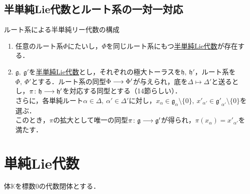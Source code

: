\documentclass[rep_main]{subfiles}
\begin{document}
\subsection{半単純Lie代数とルート系の一対一対応}
\begin{mytheo}[label=thm:root-to-Lie-alg]{ルート系による半単純リー代数の構成}
	\begin{enumerate}
		\item 任意のルート系$\Phi$にたいし，$\Phi$を同じルート系にもつ\hyperref[def:semisimple-LieAlg]{半単純Lie代数}が存在する．
		\item $\mathfrak{g},\ \mathfrak{g}'$を\hyperref[def:semisimple-LieAlg]{半単純Lie代数}とし，それぞれの極大トーラスを$\mathfrak{h},\ \mathfrak{h}'$，ルート系を$\Phi,\ \Phi'$とする．ルート系の同型$\Phi \longrightarrow \Phi'$が与えられ，底を$\Delta \mapsto \Delta'$と送るとし，$\pi\colon \mathfrak{h} \longrightarrow \mathfrak{h}'$を対応する同型とする（14節らしい）．\\
		さらに，各単純ルート$\alpha \in \Delta,\ \alpha' \in \Delta'$に対し，$x_\alpha \in \mathfrak{g}_\alpha \setminus \{0\},\ x'_{\alpha'} \in \mathfrak{g'}_{\alpha'} \setminus \{0\}$を選ぶ．\\
		このとき，$\pi$の拡大として唯一の同型$\pi\colon \mathfrak{g} \longrightarrow \mathfrak{g}'$が得られ，$\pi(x_\alpha) = x'_{\alpha'}$を満たす．
	\end{enumerate}
	
\end{mytheo}


\section{単純Lie代数}
体$\mathbb{K}$を標数$0$の代数閉体とする．
\end{document}
